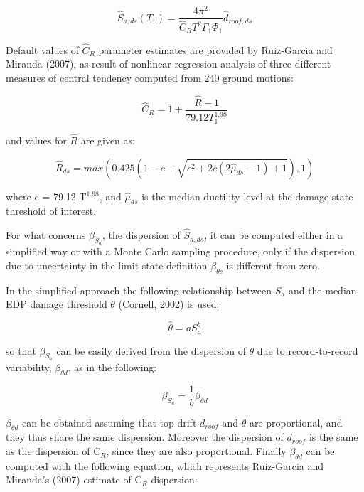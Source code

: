 \begin{equation}
\hat{S}_{a,ds}(T_1) = \frac{4 \pi^2}{\hat{C}_R T^2 \Gamma_1 \Phi_1} \hat{d}_{roof, ds}
\label{eq:Sa_RGM}
\end{equation}

Default values of $\hat{C}_R$ parameter estimates are provided by Ruiz-Garcia and Miranda (2007), as result of nonlinear regression analysis of three different measures of central tendency computed from 240 ground motions:

\begin{equation}
\hat{C}_R = 1 + \frac{\hat{R} - 1}{79.12 T_1 ^{1.98}}
\label{eq:Cr_RGM}
\end{equation}

and values for $\hat{R}$ are given as:

\begin{equation}
\hat{R}_{ds} = max(0.425(1 - c + \sqrt{c^2 + 2c(2 \hat{\mu}_{ds} - 1) + 1}),1)
\label{eq:R_RGM}
\end{equation}

where c = 79.12 T$^{1.98}$, and $\hat{\mu}_{ds}$ is the median ductility level at the damage state threshold of interest.

For what concerns $\beta_{S_a}$, the dispersion of $\hat{S}_{a,ds}$, it can be computed either in a simplified way or with a Monte Carlo sampling procedure, only if the dispersion due to uncertainty in the limit state definition $\beta_{\theta c}$ is different from zero.

In the simplified approach the following relationship between $S_a$ and the median EDP damage threshold $\hat{\theta}$ (Cornell, 2002) is used:

\begin{equation}
\hat{\theta} = a S_a^b
\end{equation}

so that $\beta_{S_a}$ can be easily derived from the dispersion of $\theta$ due to record-to-record variability, $\beta_{\theta d}$, as in the following:

\begin{equation}
\beta_{S_a} = \frac{1}{b} \beta_{\theta d}
\label{eq:betaSa_RGM}
\end{equation}

$\beta_{\theta d}$ can be obtained assuming that top drift $d_{roof}$ and $\theta$ are proportional, and they thus share the same dispersion. Moreover the dispersion of $d_{roof}$ is the same as the dispersion of C$_R$, since they are also proportional. Finally $\beta_{\theta d}$ can be computed with the following equation, which represents Ruiz-Garcia and Miranda's (2007) estimate of C$_R$ dispersion:

